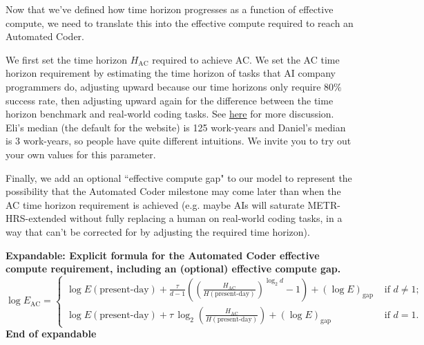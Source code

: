 \documentclass{article}
\theoremstyle{definition}
\begin{document}
Now that we've defined how time horizon progresses as a function of effective compute, we need to translate this into the effective compute required to reach an Automated Coder.

We first set the time horizon $H_{\text{AC}}$ required to achieve AC. We set the AC time horizon requirement by estimating the time horizon of tasks that AI company programmers do, adjusting upward because our time horizons only require $80\%$ success rate, then adjusting upward again for the difference between the time horizon benchmark and real-world coding tasks. See \href{https://docs.google.com/document/d/1ru6Okbxb6XuH18Cz8439sdQJazMV39hNxsWDokh97r0/edit?tab=t.0#bookmark=kix.ndlklcbf01qn}{here} for more discussion. Eli's median (the default for the website) is 125 work-years and Daniel's median is 3 work-years, so people have quite different intuitions. We invite you to try out your own values for this parameter.

Finally, we add an optional ``effective compute gap" to our model to represent the possibility that the Automated Coder milestone may come later than when the AC time horizon requirement is achieved (e.g. maybe AIs will saturate METR-HRS-extended without fully replacing a human on real-world coding tasks, in a way that can't be corrected for by adjusting the required time horizon). 


\textbf{Expandable: Explicit formula for the Automated Coder effective compute requirement, including an (optional) effective compute gap.}
\[     \log E_{\text{AC}}=
    \begin{cases}
        \log E(\text{present-day}) + \frac{\tau}{d-1}\left(\left(\frac{H_{\text{AC}}}{H(\text{present-day})}\right)^{\log_2 d}-1\right) + (\log E)_{\text{gap}} & \text{ if } d \neq 1; \\
        \log E(\text{present-day}) + \tau \,\log_2\!\left(\frac{H_{\text{AC}}}{H(\text{present-day})}\right) + (\log E)_{\text{gap}} & \text{ if } d=1.
    \end{cases}\]
\textbf{End of expandable}
\end{document}
